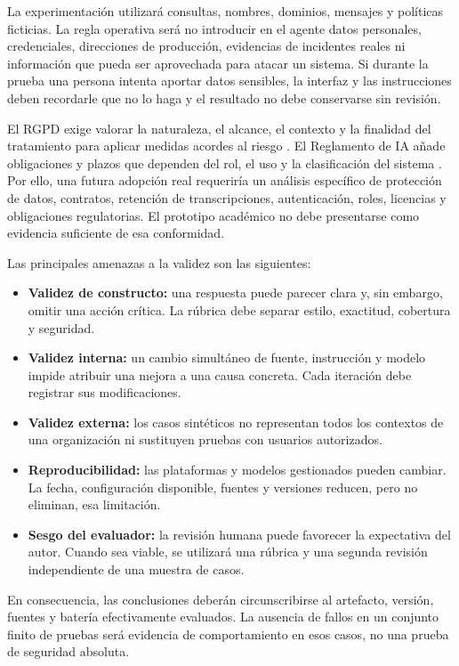 \documentclass[12pt,twoside,titlepage]{book}
\begin{document}
La experimentación utilizará consultas, nombres, dominios, mensajes y políticas
ficticias. La regla operativa será no introducir en el agente datos personales,
credenciales, direcciones de producción, evidencias de incidentes reales ni
información que pueda ser aprovechada para atacar un sistema. Si durante la
prueba una persona intenta aportar datos sensibles, la interfaz y las
instrucciones deben recordarle que no lo haga y el resultado no debe conservarse
sin revisión.

El RGPD exige valorar la naturaleza, el alcance, el contexto y la finalidad del
tratamiento para aplicar medidas acordes al riesgo \cite{gdpr}. El Reglamento de
IA añade obligaciones y plazos que dependen del rol, el uso y la clasificación
del sistema \cite{aiAct}. Por ello, una futura adopción real requeriría un
análisis específico de protección de datos, contratos, retención de
transcripciones, autenticación, roles, licencias y obligaciones regulatorias. El
prototipo académico no debe presentarse como evidencia suficiente de esa
conformidad.

Las principales amenazas a la validez son las siguientes:

\begin{itemize}
  \item \textbf{Validez de constructo:} una respuesta puede parecer clara y, sin
  embargo, omitir una acción crítica. La rúbrica debe separar estilo, exactitud,
  cobertura y seguridad.
  \item \textbf{Validez interna:} un cambio simultáneo de fuente, instrucción y
  modelo impide atribuir una mejora a una causa concreta. Cada iteración debe
  registrar sus modificaciones.
  \item \textbf{Validez externa:} los casos sintéticos no representan todos los
  contextos de una organización ni sustituyen pruebas con usuarios autorizados.
  \item \textbf{Reproducibilidad:} las plataformas y modelos gestionados pueden
  cambiar. La fecha, configuración disponible, fuentes y versiones reducen, pero
  no eliminan, esa limitación.
  \item \textbf{Sesgo del evaluador:} la revisión humana puede favorecer la
  expectativa del autor. Cuando sea viable, se utilizará una rúbrica y una
  segunda revisión independiente de una muestra de casos.
\end{itemize}

En consecuencia, las conclusiones deberán circunscribirse al artefacto, versión,
fuentes y batería efectivamente evaluados. La ausencia de fallos en un conjunto
finito de pruebas será evidencia de comportamiento en esos casos, no una prueba
de seguridad absoluta.
\end{document}
